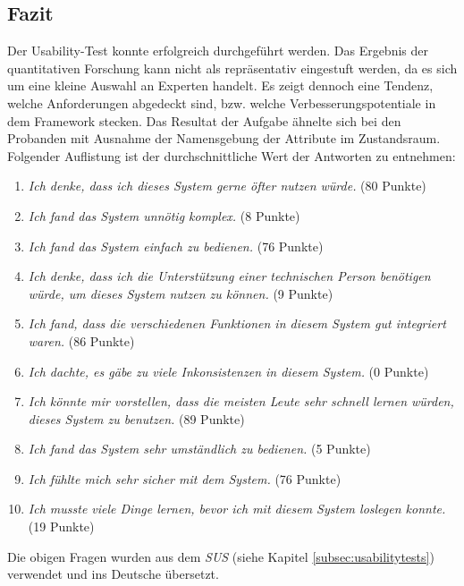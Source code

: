     \subsection{Fazit}
    \label{subsec:usabilityFazit}
        Der Usability-Test konnte erfolgreich durchgeführt werden.
        Das Ergebnis der quantitativen Forschung kann nicht als repräsentativ eingestuft werden, da es sich um eine kleine Auswahl an Experten handelt. Es zeigt dennoch eine Tendenz, 
        welche Anforderungen abgedeckt sind, bzw. welche Verbesserungspotentiale in dem Framework stecken.  
        Das Resultat der Aufgabe ähnelte sich bei den Probanden mit Ausnahme der Namensgebung der Attribute im Zustandsraum. 
        \\
        Folgender Auflistung ist der durchschnittliche Wert der Antworten zu entnehmen:
        \begin{enumerate}
            \item \textit{Ich denke, dass ich dieses System gerne öfter nutzen würde.} (80 Punkte)
            \item \textit{Ich fand das System unnötig komplex.} (8 Punkte)
            \item \textit{Ich fand das System einfach zu bedienen.} (76 Punkte)
            \item \textit{Ich denke, dass ich die Unterstützung einer technischen Person benötigen würde, um dieses System nutzen zu können.} (9 Punkte)
            \item \textit{Ich fand, dass die verschiedenen Funktionen in diesem System gut integriert waren.} (86 Punkte)
            \item \textit{Ich dachte, es gäbe zu viele Inkonsistenzen in diesem System.} (0 Punkte)
            \item \textit{Ich könnte mir vorstellen, dass die meisten Leute sehr schnell lernen würden, dieses System zu benutzen.} (89 Punkte)
            \item \textit{Ich fand das System sehr umständlich zu bedienen.} (5 Punkte)
            \item \textit{Ich fühlte mich sehr sicher mit dem System.} (76 Punkte)
            \item \textit{Ich musste viele Dinge lernen, bevor ich mit diesem System loslegen konnte.} (19 Punkte)
        \end{enumerate}
        Die obigen Fragen wurden aus dem \textit{SUS} \cite{brook1995} (siehe Kapitel \ref{subsec:usabilitytests}) verwendet und ins Deutsche übersetzt. 
        \\
